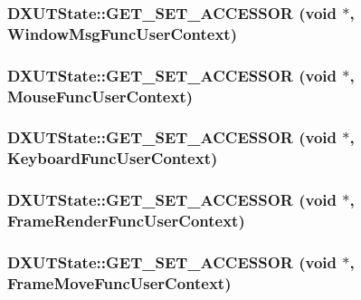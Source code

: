 \label{class_d_x_u_t_state_a33e87175ee78c0a5dff55f181237d7a2}
\hypertarget{class_d_x_u_t_state_a96022044bf967804215da24ffd507bb1}{
\subsubsection[{GET\_\-SET\_\-ACCESSOR}]{\setlength{\rightskip}{0pt plus 5cm}DXUTState::GET\_\-SET\_\-ACCESSOR (void $\ast$, \/  WindowMsgFuncUserContext)}}
\label{class_d_x_u_t_state_a96022044bf967804215da24ffd507bb1}
\hypertarget{class_d_x_u_t_state_a28dca11fe4d9f6866e95ae7ac5315f64}{
\subsubsection[{GET\_\-SET\_\-ACCESSOR}]{\setlength{\rightskip}{0pt plus 5cm}DXUTState::GET\_\-SET\_\-ACCESSOR (void $\ast$, \/  MouseFuncUserContext)}}
\label{class_d_x_u_t_state_a28dca11fe4d9f6866e95ae7ac5315f64}
\hypertarget{class_d_x_u_t_state_aa4c17cd6e0f634979e9d8619ac3ac713}{
\subsubsection[{GET\_\-SET\_\-ACCESSOR}]{\setlength{\rightskip}{0pt plus 5cm}DXUTState::GET\_\-SET\_\-ACCESSOR (void $\ast$, \/  KeyboardFuncUserContext)}}
\label{class_d_x_u_t_state_aa4c17cd6e0f634979e9d8619ac3ac713}
\hypertarget{class_d_x_u_t_state_a666a4dc6f80d57efdeb93bca8d8c5b0d}{
\subsubsection[{GET\_\-SET\_\-ACCESSOR}]{\setlength{\rightskip}{0pt plus 5cm}DXUTState::GET\_\-SET\_\-ACCESSOR (void $\ast$, \/  FrameRenderFuncUserContext)}}
\label{class_d_x_u_t_state_a666a4dc6f80d57efdeb93bca8d8c5b0d}
\hypertarget{class_d_x_u_t_state_a651459e8ec073b9e117fc074f3b912b8}{
\subsubsection[{GET\_\-SET\_\-ACCESSOR}]{\setlength{\rightskip}{0pt plus 5cm}DXUTState::GET\_\-SET\_\-ACCESSOR (void $\ast$, \/  FrameMoveFuncUserContext)}}
